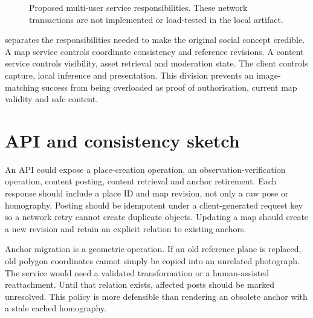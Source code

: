 \begin{figure}[htbp]\centering
{}
\caption{Proposed multi-user service responsibilities. These network transactions are not implemented or load-tested in the local artifact.}\label{fig:multiuser}
\end{figure}

 separates the responsibilities needed to make the original social concept credible. A map service controls coordinate consistency and reference revisions. A content service controls visibility, asset retrieval and moderation state. The client controls capture, local inference and presentation. This division prevents an image-matching success from being overloaded as proof of authorisation, current map validity and safe content.
\fi

\ifFullReport
\section{API and consistency sketch}
An API could expose a place-creation operation, an observation-verification operation, content posting, content retrieval and anchor retirement. Each response should include a place ID and map revision, not only a raw pose or homography. Posting should be idempotent under a client-generated request key so a network retry cannot create duplicate objects. Updating a map should create a new revision and retain an explicit relation to existing anchors.

Anchor migration is a geometric operation. If an old reference plane is replaced, old polygon coordinates cannot simply be copied into an unrelated photograph. The service would need a validated transformation or a human-assisted reattachment. Until that relation exists, affected posts should be marked unresolved. This policy is more defensible than rendering an obsolete anchor with a stale cached homography.

